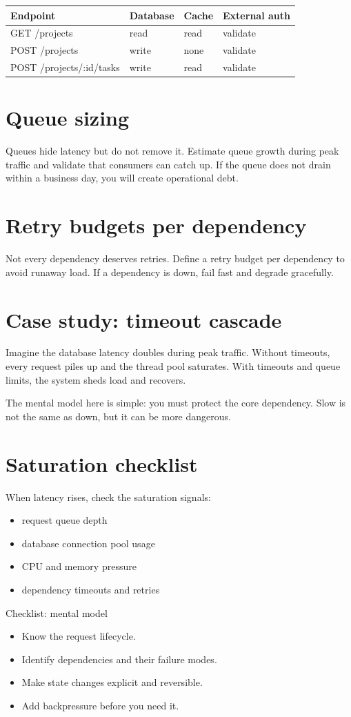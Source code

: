 \begin{tabularx}{\textwidth}{@{}lXXX@{}}
\toprule
Endpoint & Database & Cache & External auth \\
\midrule
GET /projects & read & read & validate \\
POST /projects & write & none & validate \\
POST /projects/:id/tasks & write & read & validate \\
\bottomrule
\end{tabularx}

\section{Queue sizing}
Queues hide latency but do not remove it.
Estimate queue growth during peak traffic and validate that consumers can catch up.
If the queue does not drain within a business day, you will create operational debt.

\section{Retry budgets per dependency}
Not every dependency deserves retries.
Define a retry budget per dependency to avoid runaway load.
If a dependency is down, fail fast and degrade gracefully.

\section{Case study: timeout cascade}
Imagine the database latency doubles during peak traffic.
Without timeouts, every request piles up and the thread pool saturates.
With timeouts and queue limits, the system sheds load and recovers.

The mental model here is simple: you must protect the core dependency.
Slow is not the same as down, but it can be more dangerous.

\section{Saturation checklist}
When latency rises, check the saturation signals:
\begin{itemize}[nosep]
  \item request queue depth
  \item database connection pool usage
  \item CPU and memory pressure
  \item dependency timeouts and retries
\end{itemize}

\begin{checklistbox}{Checklist: mental model}
\begin{itemize}[nosep]
  \item Know the request lifecycle.
  \item Identify dependencies and their failure modes.
  \item Make state changes explicit and reversible.
  \item Add backpressure before you need it.
\end{itemize}
\end{checklistbox}
